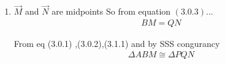 \begin{enumerate}[label=\thesection.\arabic*.,ref=\thesection.\theenumi]

%
\item $\vec{M}$ and $\vec{N}$ are midpoints So from equation $\left(3.0.3\right)$... 
%
\begin{align}
BM = QN
\end{align}

  From eq (3.0.1) ,(3.0.2),(3.1.1) and by SSS congurancy 
 \begin{align}
 \Delta ABM \cong \Delta PQN
 \end{align}
\end{enumerate}
